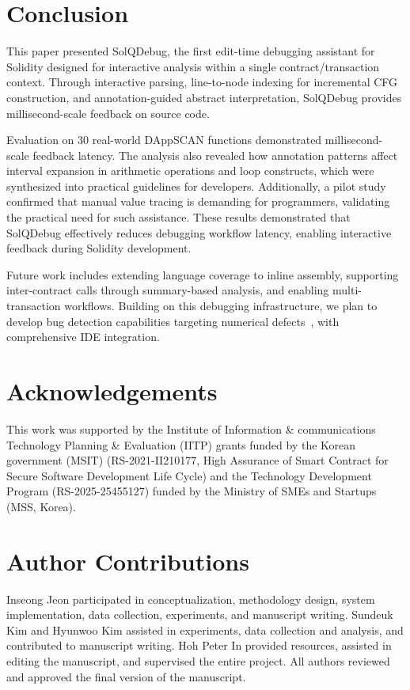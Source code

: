 \documentclass[pdflatex,sn-basic]{sn-jnl}%
\theoremstyle{thmstyleone}%
\theoremstyle{thmstyletwo}%
\theoremstyle{thmstylethree}%
\begin{document}
\section{Conclusion}
    This paper presented SolQDebug, the first edit-time debugging assistant for Solidity
    designed for interactive analysis within a single contract/transaction context.
    Through interactive parsing, line-to-node indexing for incremental CFG construction, and annotation-guided abstract interpretation,
    SolQDebug provides millisecond-scale feedback on source code.

    Evaluation on 30 real-world DAppSCAN functions demonstrated millisecond-scale feedback latency.
    The analysis also revealed how annotation patterns affect interval expansion in arithmetic operations and loop constructs, which were synthesized into practical guidelines for developers.
    Additionally, a pilot study confirmed that manual value tracing is demanding for programmers, validating the practical need for such assistance.
    These results demonstrated that SolQDebug effectively reduces debugging workflow latency, enabling interactive feedback during Solidity development.

    Future work includes extending language coverage to inline assembly, supporting inter-contract calls through summary-based analysis, and enabling multi-transaction workflows.
    Building on this debugging infrastructure, we plan to develop bug detection capabilities targeting numerical defects~\citep{numscout}, with comprehensive IDE integration.

\section*{Acknowledgements}
This work was supported by the Institute of Information \& communications Technology Planning \& Evaluation (IITP) grants funded by the Korean government (MSIT) (RS-2021-II210177, High Assurance of Smart Contract for Secure Software Development Life Cycle) and the Technology Development Program (RS-2025-25455127) funded by the Ministry of SMEs and Startups (MSS, Korea).

\section*{Author Contributions}
Inseong Jeon participated in conceptualization, methodology design, system implementation, data collection, experiments, and manuscript writing. Sundeuk Kim and Hyunwoo Kim assisted in experiments, data collection and analysis, and contributed to manuscript writing. Hoh Peter In provided resources, assisted in editing the manuscript, and supervised the entire project. All authors reviewed and approved the final version of the manuscript.
\end{document}
